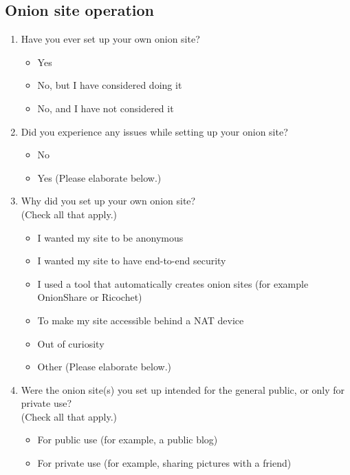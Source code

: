 \subsection{Onion site operation}
\begin{enumerate}
    \item Have you ever set up your own onion site?
        \begin{itemize}[label=$\Circle$]
            \item Yes
            \item No, but I have considered doing it
            \item No, and I have not considered it
        \end{itemize}

    \item Did you experience any issues while setting up your onion site?
        \begin{itemize}[label=$\Circle$]
            \item No
            \item Yes (Please elaborate below.)
        \end{itemize}

    \item Why did you set up your own onion site?\\(Check all that apply.)
        \begin{itemize}[label=$\Square$]
            \item I wanted my site to be anonymous
            \item I wanted my site to have end-to-end security
            \item I used a tool that automatically creates onion sites (for
                example OnionShare or Ricochet)
            \item To make my site accessible behind a NAT device
            \item Out of curiosity
            \item Other (Please elaborate below.)
        \end{itemize}

    \item Were the onion site(s) you set up intended for the general public, or
        only for private use?\\(Check all that apply.)
        \begin{itemize}[label=$\Square$]
            \item For public use (for example, a public blog)
            \item For private use (for example, sharing pictures with a friend)
        \end{itemize}


\end{enumerate}
